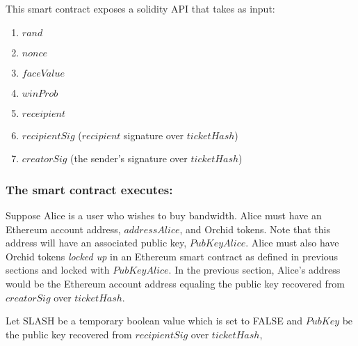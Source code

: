 This smart contract exposes a solidity API that takes as input:
\begin{enumerate}%
  \item $rand$
  \item $nonce$
  \item $faceValue$
  \item $winProb$
  \item $receipient$
  \item $recipientSig$ ($recipient$ signature over $ticketHash$)
  \item $creatorSig$ (the sender's signature over $ticketHash$)
\end{enumerate}

\subsubsection{The smart contract executes:}


Suppose Alice is a user who wishes to buy bandwidth. Alice must have an Ethereum account address, $addressAlice$, and Orchid tokens. Note that this address will have an associated public key, $PubKeyAlice$. Alice must also have Orchid tokens \textit{locked up} in an Ethereum smart contract as defined in previous sections and locked with $PubKeyAlice$. In the previous section, Alice's address would be the Ethereum account address equaling the public key recovered from $creatorSig$ over $ticketHash$.

Let SLASH be a temporary boolean value which is set to FALSE and $PubKey$ be the public key recovered from $recipientSig$ over $ticketHash$,

